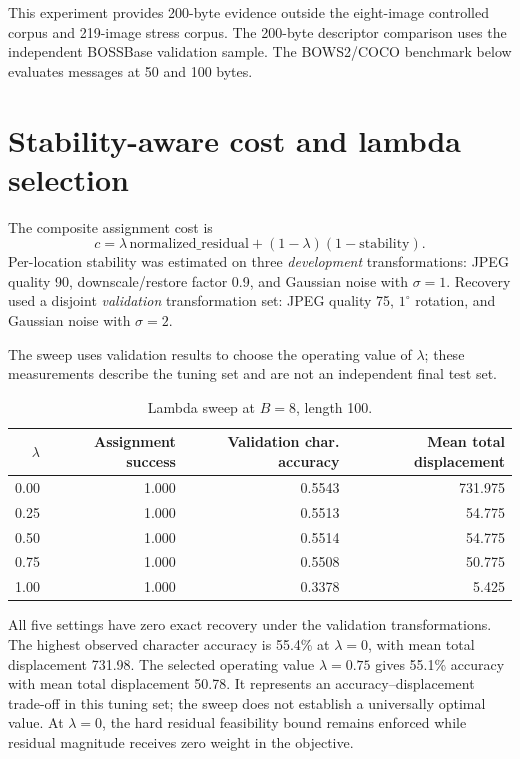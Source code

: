 ﻿\documentclass[11pt,a4paper]{article}
\begin{document}
This experiment provides 200-byte evidence outside the eight-image controlled corpus and 219-image stress corpus. The 200-byte descriptor comparison uses the independent BOSSBase validation sample. The BOWS2/COCO benchmark below evaluates messages at 50 and 100 bytes.

\section{Stability-aware cost and lambda selection}
The composite assignment cost is
\[
c=\lambda\,\mathrm{normalized\_residual}+(1-\lambda)(1-\mathrm{stability}).
\]
Per-location stability was estimated on three \emph{development} transformations: JPEG quality 90, downscale/restore factor 0.9, and Gaussian noise with $\sigma=1$. Recovery used a disjoint \emph{validation} transformation set: JPEG quality 75, $1^\circ$ rotation, and Gaussian noise with $\sigma=2$.

The sweep uses validation results to choose the operating value of $\lambda$; these measurements describe the tuning set and are not an independent final test set.

\begin{table}[h]
\centering
\caption{Lambda sweep at $B=8$, length 100.}
\begin{tabular}{rrrr}
\toprule
$\lambda$ & Assignment success & Validation char. accuracy & Mean total displacement\\
\midrule
0.00 & 1.000 & 0.5543 & 731.975\\
0.25 & 1.000 & 0.5513 & 54.775\\
0.50 & 1.000 & 0.5514 & 54.775\\
0.75 & 1.000 & 0.5508 & 50.775\\
1.00 & 1.000 & 0.3378 & 5.425\\
\bottomrule
\end{tabular}
\end{table}

All five settings have zero exact recovery under the validation transformations. The highest observed character accuracy is 55.4\% at $\lambda=0$, with mean total displacement 731.98. The selected operating value $\lambda=0.75$ gives 55.1\% accuracy with mean total displacement 50.78. It represents an accuracy--displacement trade-off in this tuning set; the sweep does not establish a universally optimal value. At $\lambda=0$, the hard residual feasibility bound remains enforced while residual magnitude receives zero weight in the objective.
\end{document}
